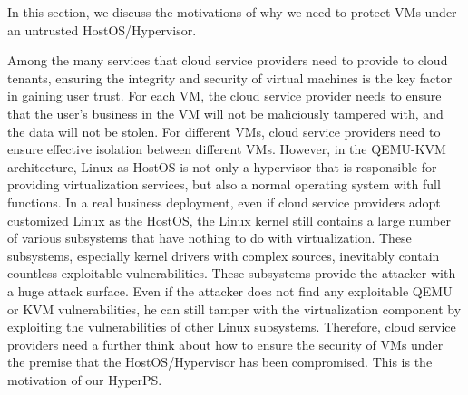 In this section, we discuss the motivations of why we need to protect VMs under an untrusted HostOS/Hypervisor.

Among the many services that cloud service providers need to provide to cloud tenants, ensuring the integrity and security of virtual machines is the key factor in gaining user trust. For each VM, the cloud service provider needs to ensure that the user's business in the VM will not be maliciously tampered with, and the data will not be stolen. For different VMs, cloud service providers need to ensure effective isolation between different VMs. However, in the QEMU-KVM architecture, Linux as HostOS is not only a hypervisor that is responsible for providing virtualization services, but also a normal operating system with full functions. In a real business deployment, even if cloud service providers adopt customized Linux as the HostOS, the Linux kernel still contains a large number of various subsystems that have nothing to do with virtualization. These subsystems, especially kernel drivers with complex sources, inevitably contain countless exploitable vulnerabilities. These subsystems provide the attacker with a huge attack surface. Even if the attacker does not find any exploitable QEMU or KVM vulnerabilities, he can still tamper with the virtualization component by exploiting the vulnerabilities of other Linux subsystems. Therefore, cloud service providers need a further think about how to ensure the security of VMs under the premise that the HostOS/Hypervisor has been compromised. This is the motivation of our HyperPS.


